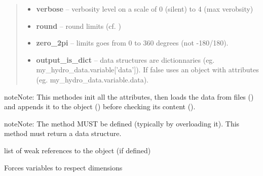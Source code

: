 \documentclass[letterpaper,10pt,english]{sphinxmanual}
\begin{document}
\begin{fulllineitems}
\begin{fulllineitems}
\begin{quote}
\begin{description}
\begin{itemize}
\item {} 
\textbf{verbose} -- verbosity level on a scale of 0 (silent) to 4 (max verobsity)

\item {} 
\textbf{round} -- round limits (cf. )

\item {} 
\textbf{zero\_2pi} -- limits goes from 0 to 360 degrees (not -180/180).

\item {} 
\textbf{output\_is\_dict} -- data structures are dictionnaries (eg. my\_hydro\_data.variable{[}'data'{]}). If false uses an object with attributes (eg. my\_hydro\_data.variable.data).

\end{itemize}

\end{description}\end{quote}

\begin{notice}{note}{Note:}
This methodes init all the attributes, then loads the data from files () and appends it to the object ({\hyperref[altimetry.data:altimetry.data.hydro_data.update_dataset]{}}) before checking its content ({\hyperref[altimetry.data:altimetry.data.hydro_data.check_variables]{}}).
\end{notice}

\begin{notice}{note}{Note:}
The method  MUST be defined (typically by overloading it). This method must return a data structure.
\end{notice}

\end{fulllineitems}


\begin{fulllineitems}
\label{altimetry.data:altimetry.data.hydro_data.__weakref__}
list of weak references to the object (if defined)

\end{fulllineitems}


\begin{fulllineitems}
\label{altimetry.data:altimetry.data.hydro_data.check_variables}
Forces variables to respect dimensions


\end{fulllineitems}
\end{fulllineitems}
\end{document}
